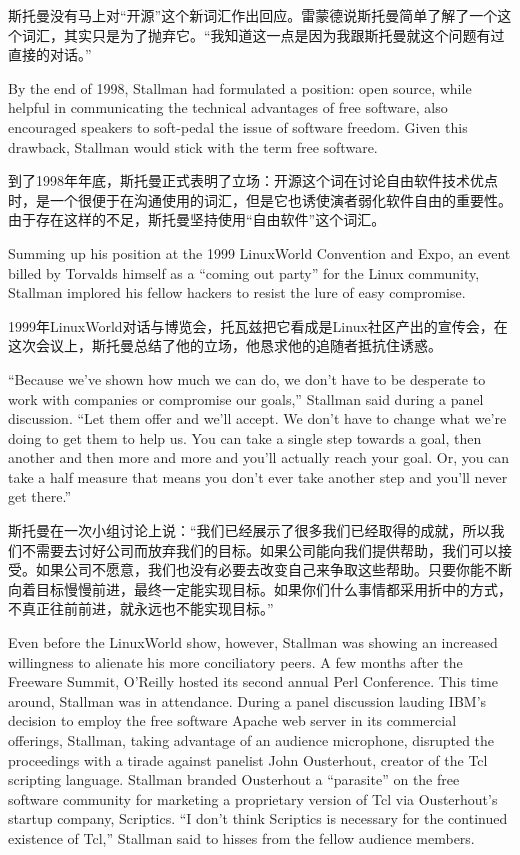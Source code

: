 \ifdefined\chs
斯托曼没有马上对``开源''这个新词汇作出回应。雷蒙德说斯托曼简单了解了一个这个词汇，其实只是为了抛弃它。``我知道这一点是因为我跟斯托曼就这个问题有过直接的对话。''
\fi

\ifdefined\eng
By the end of 1998, Stallman had formulated a position: open source, while helpful in communicating the technical advantages of free software, also encouraged speakers to soft-pedal the issue of software freedom. Given this drawback, Stallman would stick with the term free software.
\fi

\ifdefined\chs
到了1998年年底，斯托曼正式表明了立场：开源这个词在讨论自由软件技术优点时，是一个很便于在沟通使用的词汇，但是它也诱使演者弱化软件自由的重要性。由于存在这样的不足，斯托曼坚持使用``自由软件''这个词汇。
\fi

\ifdefined\eng
Summing up his position at the 1999 LinuxWorld Convention and Expo, an event billed by Torvalds himself as a ``coming out party'' for the Linux community, Stallman implored his fellow hackers to resist the lure of easy compromise.
\fi

\ifdefined\chs
1999年LinuxWorld对话与博览会，托瓦兹把它看成是Linux社区产出的宣传会，在这次会议上，斯托曼总结了他的立场，他恳求他的追随者抵抗住诱惑。
\fi

\ifdefined\eng
``Because we've shown how much we can do, we don't have to be desperate to work with companies or compromise our goals,'' Stallman said during a panel discussion. ``Let them offer and we'll accept. We don't have to change what we're doing to get them to help us. You can take a single step towards a goal, then another and then more and more and you'll actually reach your goal. Or, you can take a half measure that means you don't ever take another step and you'll never get there.''
\fi

\ifdefined\chs
斯托曼在一次小组讨论上说：``我们已经展示了很多我们已经取得的成就，所以我们不需要去讨好公司而放弃我们的目标。如果公司能向我们提供帮助，我们可以接受。如果公司不愿意，我们也没有必要去改变自己来争取这些帮助。只要你能不断向着目标慢慢前进，最终一定能实现目标。如果你们什么事情都采用折中的方式，不真正往前前进，就永远也不能实现目标。''
\fi

\ifdefined\eng
Even before the LinuxWorld show, however, Stallman was showing an increased willingness to alienate his more conciliatory peers. A few months after the Freeware Summit, O'Reilly hosted its second annual Perl Conference. This time around, Stallman was in attendance. During a panel discussion lauding IBM's decision to employ the free software Apache web server in its commercial offerings, Stallman, taking advantage of an audience microphone, disrupted the proceedings with a tirade against panelist John Ousterhout, creator of the Tcl scripting language. Stallman branded Ousterhout a ``parasite'' on the free software community for marketing a proprietary version of Tcl via Ousterhout's startup company, Scriptics. ``I don't think Scriptics is necessary for the continued existence of Tcl,'' Stallman said to hisses from the fellow audience members.\endnote{}
\fi

